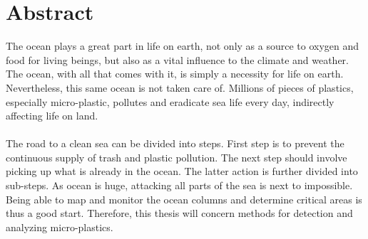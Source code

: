 \chapter*{Abstract}

The ocean plays a great part in life on earth, not only as a source to oxygen and food for living beings, but also as a vital influence to the climate and weather. The ocean, with all that comes with it, is simply a necessity for life on earth. Nevertheless, this same ocean is not taken care of. Millions of pieces of plastics, especially micro-plastic, pollutes and eradicate sea life every day, indirectly affecting life on land. 
\\\\
The road to a clean sea can be divided into steps. First step is to prevent the continuous supply of trash and plastic pollution. The next step should involve picking up what is already in the ocean. The latter action is further divided into sub-steps. As ocean is huge, attacking all parts of the sea is next to impossible. Being able to map and monitor the ocean columns and determine critical areas is thus a good start. Therefore, this thesis will concern methods for detection and analyzing micro-plastics. 


\hypersetup{pageanchor=false}